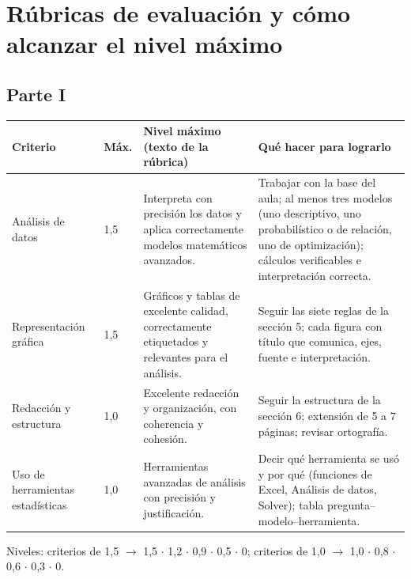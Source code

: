\section{Rúbricas de evaluación y cómo alcanzar el nivel máximo}

\subsection{Parte I}
\begin{center}
\scriptsize
\begin{tabularx}{\textwidth}{@{}p{2.2cm}p{0.6cm}XX@{}}
\toprule
\textbf{Criterio} & \textbf{Máx.} & \textbf{Nivel máximo (texto de la rúbrica)} & \textbf{Qué hacer para lograrlo}\\
\midrule
Análisis de datos & 1,5 & Interpreta con precisión los datos y aplica correctamente modelos matemáticos avanzados. & Trabajar con la base del aula; al menos tres modelos (uno descriptivo, uno probabilístico o de relación, uno de optimización); cálculos verificables e interpretación correcta.\\[3pt]
Representación gráfica & 1,5 & Gráficos y tablas de excelente calidad, correctamente etiquetados y relevantes para el análisis. & Seguir las siete reglas de la sección 5; cada figura con título que comunica, ejes, fuente e interpretación.\\[3pt]
Redacción y estructura & 1,0 & Excelente redacción y organización, con coherencia y cohesión. & Seguir la estructura de la sección 6; extensión de 5 a 7 páginas; revisar ortografía.\\[3pt]
Uso de herramientas estadísticas & 1,0 & Herramientas avanzadas de análisis con precisión y justificación. & Decir qué herramienta se usó y por qué (funciones de Excel, Análisis de datos, Solver); tabla pregunta--modelo--herramienta.\\
\bottomrule
\end{tabularx}
\end{center}
Niveles: criterios de 1,5 $\rightarrow$ 1,5 $\cdot$ 1,2 $\cdot$ 0,9 $\cdot$ 0,5 $\cdot$ 0;
criterios de 1,0 $\rightarrow$ 1,0 $\cdot$ 0,8 $\cdot$ 0,6 $\cdot$ 0,3 $\cdot$ 0.

